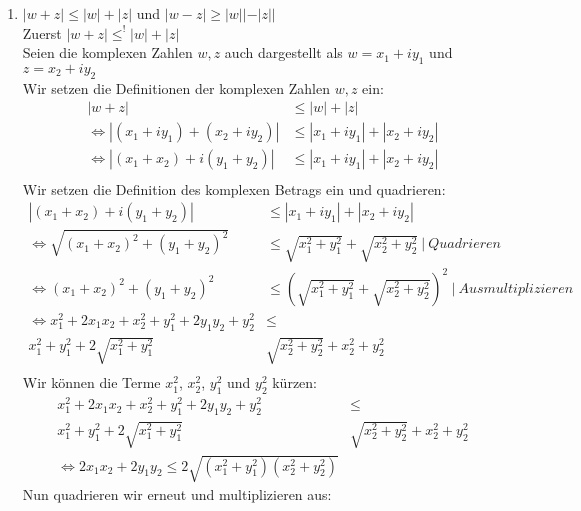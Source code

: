 \documentclass{article}
\begin{document}
\begin{enumerate}[ label = (\alph*) ]
\begin{enumerate}
            \item \( |w + z| \leq |w| + |z| \) und \( |w-z| \geq |w||-|z|| \) \\
            Zuerst \( |w + z| \leq^! |w| + |z| \) \\
            Seien die komplexen Zahlen \(w, z\) auch dargestellt als \(w = x_1 + iy_1 \) und \(z = x_2 + iy_2 \) \\
            Wir setzen die Definitionen der komplexen Zahlen \(w, z\) ein:
            \begin{align*}
                |w + z| &\leq |w| + |z| \\
                \Leftrightarrow |(x_1 + iy_1) + (x_2 + iy_2) | &\leq |x_1 + iy_1| + |x_2 + iy_2| \\ 
                \Leftrightarrow |(x_1 + x_2) + i(y_1 + y_2) | &\leq |x_1 + iy_1| + |x_2 + iy_2| \\
            \end{align*}
            Wir setzen die Definition des komplexen Betrags ein und quadrieren:
            \begin{align*}
                |(x_1 + x_2) + i(y_1 + y_2) | &\leq |x_1 + iy_1| + |x_2 + iy_2| \\
                \Leftrightarrow \sqrt{ {(x_1 + x_2)}^2 + {(y_1 + y_2)}^2 } &\leq \sqrt{ x_1^2 + y_1^2} + \sqrt{ x_2^2 + y_2^2} \ | \ Quadrieren \\
                \Leftrightarrow {(x_1 + x_2)}^2 + {(y_1 + y_2)}^2 &\leq {\left( \sqrt{ x_1^2 + y_1^2} + \sqrt{ x_2^2 + y_2^2} \right)}^2 \ | \ Ausmultiplizieren \\
                \Leftrightarrow x_1^2 + 2 x_1 x_2 + x_2^2 + y_1^2 + 2 y_1 y_2 + y_2^2 &\leq \\ 
                x_1^2 + y_1^2 + 2 \sqrt{ x_1^2 + y_1^2} & \sqrt{ x_2^2 + y_2^2} + x_2^2 + y_2^2 \\
            \end{align*}
            Wir können die Terme \(x_1^2\), \(x_2^2\), \(y_1^2\) und \(y_2^2\) kürzen:
            \begin{align*}
                x_1^2 + 2 x_1 x_2 + x_2^2 + y_1^2 + 2 y_1 y_2 + y_2^2 &\leq \\ 
                x_1^2 + y_1^2 + 2 \sqrt{ x_1^2 + y_1^2} & \sqrt{ x_2^2 + y_2^2} + x_2^2 + y_2^2 \\
                \Leftrightarrow 2 x_1 x_2  + 2 y_1 y_2 \leq 2 \sqrt{ (x_1^2 + y_1^2) (x_2^2 + y_2^2) }
            \end{align*}
            Nun quadrieren wir erneut und multiplizieren aus:

\end{enumerate}
\end{enumerate}
\end{document}
